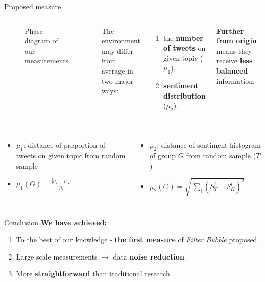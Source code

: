 \documentclass{beamer}
\begin{document}
\begin{frame}[fragile]
\begin{columns}[T]
\begin{column}{.63\textwidth}
\begin{block}{Proposed measure}
\begin{columns}
\begin{figure}
                \caption*{Phase diagram of our measurements.}
            \end{figure}
            The environment may differ from average in two major ways:
            \vspace{1cm}
            \begin{enumerate}
                \item the \textbf{number of tweets} on given topic ($\mu_1$),
                \item \textbf{sentiment distribution} ($\mu_2$).
            \end{enumerate}
            \vspace{1cm}
            \textbf{Further from origin} means they receive \textbf{less balanced} information.
    \end{columns}
    \begin{columns}
            \begin{itemize}
                \item $\mu_1$: distance of proportion of tweets on given topic from random sample
                \item $\mu_1(G) = \frac{|p_T - p_G|}{p_t}$
            \end{itemize}
            \begin{itemize}
                \item $\mu_2$: distance of sentiment histogram of group $G$ from random sample ($T$)
                \item $\mu_2(G) = \sqrt{\sum_{i}{\left(S_T^i - S_G^i\right)^2}}$
            \end{itemize}
    \end{columns}
\end{block}
\begin{customalertblock}{Conclusion}
    \underline{\textbf{We have achieved:}}
    \vspace{1cm}
    \begin{enumerate}
        \item To the best of our knowledge - \textbf{the first measure} of \textit{Filter Bubble} proposed.
        \item Large scale measurements $\rightarrow$ data \textbf{noise reduction}.
        \item More \textbf{straightforward} than traditional research.
    \end{enumerate}

\end{customalertblock}
\end{column}
\end{columns}
\end{frame}
\end{document}
